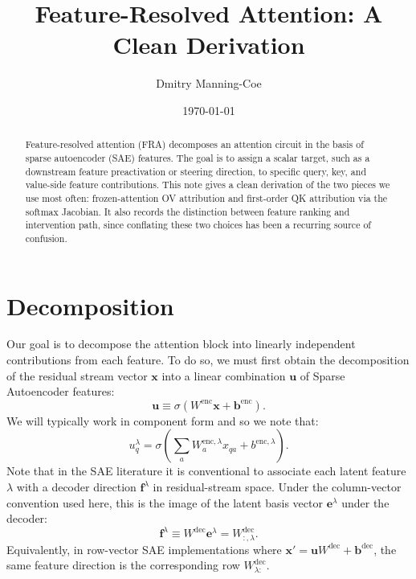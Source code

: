 \documentclass[11pt]{article}
\title{Feature-Resolved Attention: A Clean Derivation}
\author{Dmitry Manning-Coe}
\date{\today}
\theoremstyle{definition}
\theoremstyle{plain}
\theoremstyle{remark}
\begin{document}
\maketitle

\begin{abstract}
Feature-resolved attention (FRA) decomposes an attention circuit in the basis
of sparse autoencoder (SAE) features.  The goal is to assign a scalar target,
such as a downstream feature preactivation or steering direction, to specific
query, key, and value-side feature contributions.  This note gives a clean
derivation of the two pieces we use most often: frozen-attention OV attribution
and first-order QK attribution via the softmax Jacobian.  It also records the
distinction between feature ranking and intervention path, since conflating
these two choices has been a recurring source of confusion.
\end{abstract}

\tableofcontents

\section{Decomposition}
Our goal is to decompose the attention block into linearly independent contributions from each feature. To do so, we must first obtain the decomposition of the residual stream vector $\mathbf{x}$ into a linear combination $\mathbf{u}$ of Sparse Autoencoder features:
\begin{equation}
    \mathbf{u}\equiv\sigma\left(W^{\textrm{enc}}\mathbf{x}+\mathbf{b}^{\textrm{enc}}\right).
\end{equation}
We will typically work in component form and so we note that:
\begin{equation}
    u^\lambda_{q}=\sigma\left(\sum_{a}
       W^{\textrm{enc},\lambda}_a x_{q a}+b^{\textrm{enc},\lambda}
    \right).
\end{equation}
Note that in the SAE literature it is conventional to associate each latent feature $\lambda$ with a decoder direction $\mathbf{f}^\lambda$ in residual-stream space. Under the column-vector convention used here, this is the image of the latent basis vector $\mathbf{e}^\lambda$ under the decoder:
\begin{equation}
    \mathbf{f}^\lambda\equiv W^{\textrm{dec}}\mathbf{e}^\lambda
    = W^{\textrm{dec}}_{:,\lambda}.
\end{equation}
Equivalently, in row-vector SAE implementations where $\mathbf{x}'=\mathbf{u}W^{\textrm{dec}}+\mathbf{b}^{\textrm{dec}}$, the same feature direction is the corresponding row $W^{\textrm{dec}}_{\lambda:}$.
\end{document}
